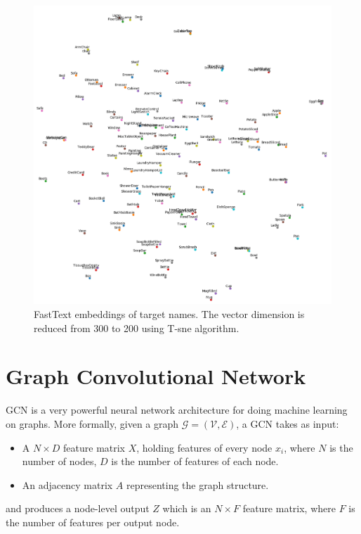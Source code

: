 \begin{figure}
\centering
\includegraphics[scale=0.3]{charts/tsne.png}
\caption{FastText embeddings of target names. The vector dimension is reduced from 300 to 200 using T-sne \cite{tsne} algorithm.}
\end{figure}

\section{Graph Convolutional Network}

GCN is a very powerful neural network architecture for doing machine learning on graphs. More formally, given a graph $\mathcal{G}=(\mathcal{V}, \mathcal{E})$, a GCN takes as input:
\begin{itemize}
\item A $N\times D$ feature matrix $X$, holding features of every node $x_i$, where $N$ is the number of nodes, $D$ is the number of features of each node.
\item An adjacency matrix $A$ representing the graph structure.
\end{itemize}
and produces a node-level output $Z$ which is an $N\times F$ feature matrix, where $F$ is the number of features per output node. 


